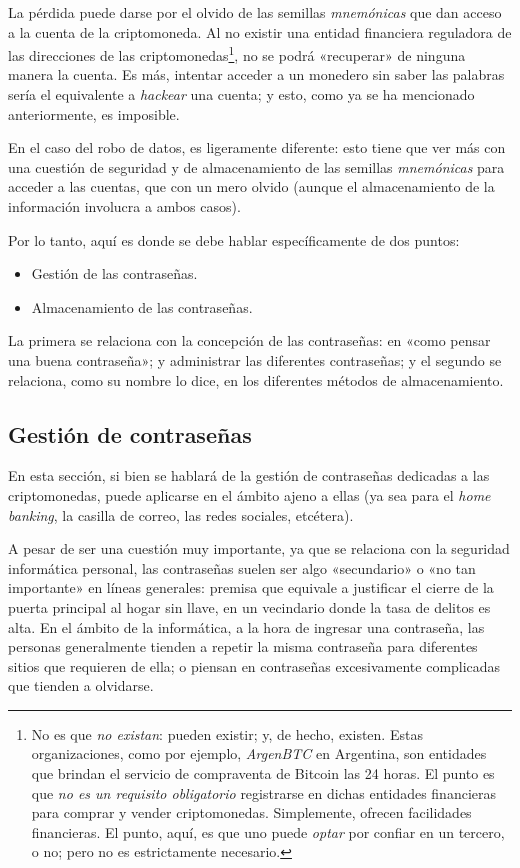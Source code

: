 \documentclass[12pt,a4paper,twoside]{book}
\begin{document}
La pérdida puede darse por el olvido de las semillas \textit{mnemónicas} que dan acceso a la cuenta de la criptomoneda. Al no existir una entidad financiera reguladora de las direcciones de las criptomonedas\footnote{No es que \textit{no existan}: pueden existir; y, de hecho, existen. Estas organizaciones, como por ejemplo, \textit{ArgenBTC} en Argentina, son entidades que brindan el servicio de compraventa de Bitcoin las 24 horas. El punto es que \textit{no es un requisito obligatorio} registrarse en dichas entidades financieras para comprar y vender criptomonedas. Simplemente, ofrecen facilidades financieras. El punto, aquí, es que uno puede \textit{optar} por confiar en un tercero, o no; pero no es estrictamente necesario.}, no se podrá «recuperar» de ninguna manera la cuenta. Es más, intentar acceder a un monedero sin saber las palabras sería el equivalente a \textit{hackear} una cuenta; y esto, como ya se ha mencionado anteriormente, es imposible.

En el caso del robo de datos, es ligeramente diferente: esto tiene que ver más con una cuestión de seguridad y de almacenamiento de las semillas \textit{mnemónicas} para acceder a las cuentas, que con un mero olvido (aunque el almacenamiento de la información involucra a ambos casos).

Por lo tanto, aquí es donde se debe hablar específicamente de dos puntos:

\begin{itemize}
\item Gestión de las contraseñas.
\item Almacenamiento de las contraseñas.
\end{itemize} 

La primera se relaciona con la concepción de las contraseñas: en «como pensar una buena contraseña»; y administrar las diferentes contraseñas; y el segundo se relaciona, como su nombre lo dice, en los diferentes métodos de almacenamiento.

\subsection{Gestión de contraseñas}
En esta sección, si bien se hablará de la gestión de contraseñas dedicadas a las criptomonedas, puede aplicarse en el ámbito ajeno a ellas (ya sea para el \textit{home banking}, la casilla de correo, las redes sociales, etcétera).

A pesar de ser una cuestión muy importante, ya que se relaciona con la seguridad informática personal, las contraseñas suelen ser algo «secundario» o «no tan importante» en líneas generales: premisa que equivale a justificar el cierre de la puerta principal al hogar sin llave, en un vecindario donde la tasa de delitos es alta. En el ámbito de la informática, a la hora de ingresar una contraseña, las personas generalmente tienden a repetir la misma contraseña para diferentes sitios que requieren de ella; o piensan en contraseñas excesivamente complicadas que tienden a olvidarse.
\end{document}

